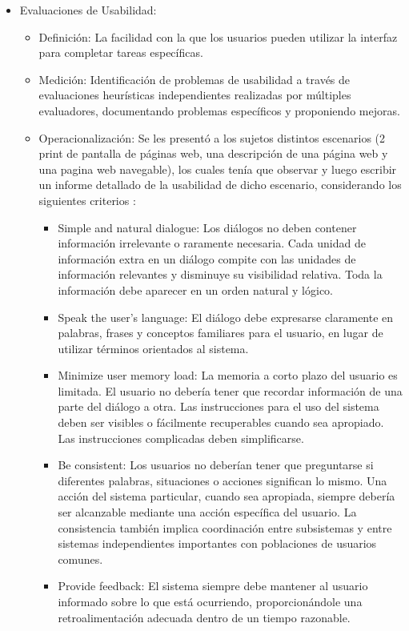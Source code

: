 \begin{itemize}
    \item Evaluaciones de Usabilidad: \cite{nielsen1990heuristic}
    \begin{itemize}
        \item Definición: La facilidad con la que los usuarios pueden utilizar la interfaz para completar tareas específicas.
        \item Medición: Identificación de problemas de usabilidad a través de evaluaciones heurísticas independientes realizadas por múltiples evaluadores, documentando problemas específicos y proponiendo mejoras.
        \item Operacionalización: Se les presentó a los sujetos distintos escenarios (2 print de pantalla de páginas web, una descripción de una página web y una pagina web navegable), los cuales tenía que observar y luego escribir un informe detallado de la usabilidad de dicho escenario, considerando los siguientes criterios \cite{molich1990}: 
        \begin{itemize}
            \item Simple and natural dialogue: Los diálogos no deben contener información irrelevante o raramente necesaria. Cada unidad de información extra en un diálogo compite con las unidades de información relevantes y disminuye su visibilidad relativa. Toda la información debe aparecer en un orden natural y lógico.
            \item Speak the user’s language: El diálogo debe expresarse claramente en palabras, frases y conceptos familiares para el usuario, en lugar de utilizar términos orientados al sistema.
            \item Minimize user memory load: La memoria a corto plazo del usuario es limitada. El usuario no debería tener que recordar información de una parte del diálogo a otra. Las instrucciones para el uso del sistema deben ser visibles o fácilmente recuperables cuando sea apropiado. Las instrucciones complicadas deben simplificarse.
            \item  Be consistent: Los usuarios no deberían tener que preguntarse si diferentes palabras, situaciones o acciones significan lo mismo. Una acción del sistema particular, cuando sea apropiada, siempre debería ser alcanzable mediante una acción específica del usuario. La consistencia también implica coordinación entre subsistemas y entre sistemas independientes importantes con poblaciones de usuarios comunes.
            \item Provide feedback: El sistema siempre debe mantener al usuario informado sobre lo que está ocurriendo, proporcionándole una retroalimentación adecuada dentro de un tiempo razonable.

\end{itemize}
\end{itemize}
\end{itemize}
